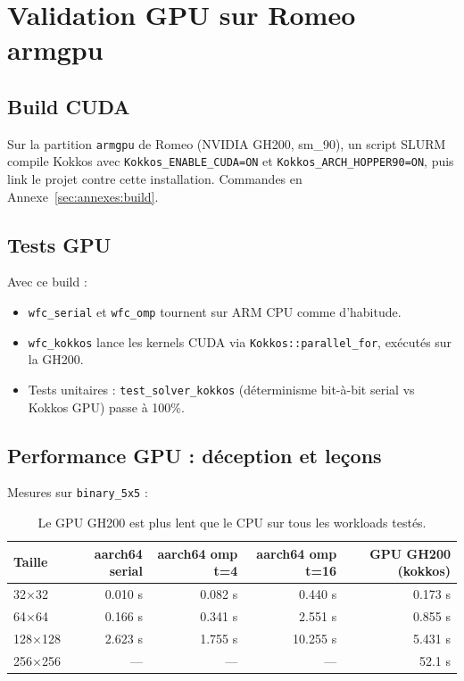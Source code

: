 \section{Validation GPU sur Romeo armgpu}
\label{sec:kokkos:gpu_validation}

\subsection{Build CUDA}

Sur la partition \texttt{armgpu} de Romeo (NVIDIA GH200, sm\_90), un
script SLURM compile Kokkos avec
\texttt{Kokkos\_ENABLE\_CUDA=ON} et
\texttt{Kokkos\_ARCH\_HOPPER90=ON}, puis link le projet contre cette
installation. Commandes en Annexe~\ref{sec:annexes:build}.

\subsection{Tests GPU}

Avec ce build :
\begin{itemize}
    \item \texttt{wfc\_serial} et \texttt{wfc\_omp} tournent sur ARM CPU comme d'habitude.
    \item \texttt{wfc\_kokkos} lance les kernels CUDA via \texttt{Kokkos::parallel\_for}, exécutés sur la GH200.
    \item Tests unitaires : \texttt{test\_solver\_kokkos} (déterminisme bit-à-bit serial vs Kokkos GPU) passe à 100\%.
\end{itemize}

\subsection{Performance GPU : déception et leçons}

Mesures sur \texttt{binary\_5x5} :

\begin{table}[H]
\centering
\begin{tabular}{lrrrr}
\toprule
\textbf{Taille} & \textbf{aarch64 serial} & \textbf{aarch64 omp t=4} & \textbf{aarch64 omp t=16} & \textbf{GPU GH200 (kokkos)} \\
\midrule
32×32 & 0.010 s & 0.082 s & 0.440 s & 0.173 s \\
64×64 & 0.166 s & 0.341 s & 2.551 s & 0.855 s \\
128×128 & 2.623 s & 1.755 s & 10.255 s & 5.431 s \\
256×256 & --- & --- & --- & 52.1 s \\
\bottomrule
\end{tabular}
\caption{Le GPU GH200 est plus lent que le CPU sur tous les workloads testés.}
\label{tab:kokkos:gpu_perf}
\end{table}

